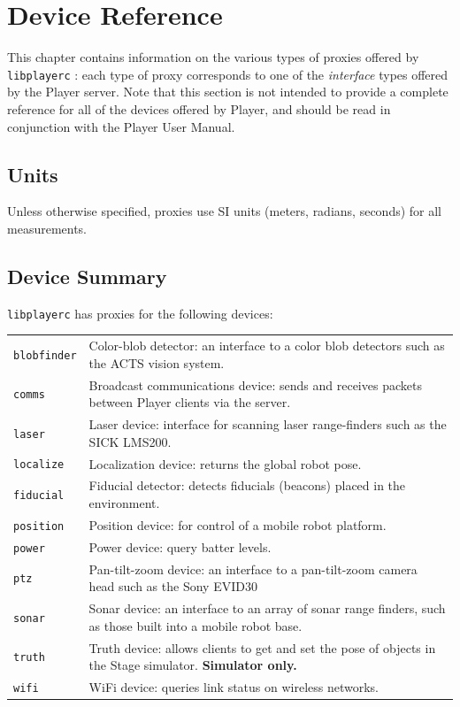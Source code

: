 \documentclass[11pt]{report}
\def\libplayerc {{\tt libplayerc} }
\begin{document}



\chapter{Device Reference}
\label{chap.devices}

This chapter contains information on the various types of proxies
offered by \libplayerc: each type of proxy corresponds to one of the
{\em interface} types offered by the Player server.  Note that this
section is not intended to provide a complete reference for all of the
devices offered by Player, and should be read in conjunction with the
Player User Manual.


\section{Units}

Unless otherwise specified, proxies use SI units (meters, radians,
seconds) for all measurements.

\section{Device Summary}

\libplayerc has proxies for the following devices:

\noindent
\begin{tabularx}{\columnwidth}{lX}
\hline
{\tt blobfinder} & Color-blob detector: an interface to a color blob detectors such as the
ACTS vision system.\\
{\tt comms} & Broadcast communications device: sends and receives packets between Player
clients via the server.\\
{\tt laser} & Laser device: interface for scanning laser range-finders
such as the SICK LMS200.\\
{\tt localize} & Localization device: returns the global robot pose.\\
{\tt fiducial} & Fiducial detector: detects fiducials (beacons) placed in the
environment.\\
{\tt position} & Position device: for control of a mobile robot platform.\\
{\tt power} & Power device: query batter levels.\\
{\tt ptz} & Pan-tilt-zoom device: an interface to a pan-tilt-zoom camera
head such as the Sony EVID30 \\
{\tt sonar} & Sonar device: an interface to an array of sonar range finders, 
such as those built into a mobile robot base.\\
{\tt truth} & Truth device: allows clients to get and set the pose of
objects in the Stage simulator.  {\bf Simulator only.}\\
{\tt wifi} & WiFi device: queries link status on wireless networks.\\
\hline
\end{tabularx}
\end{document}
